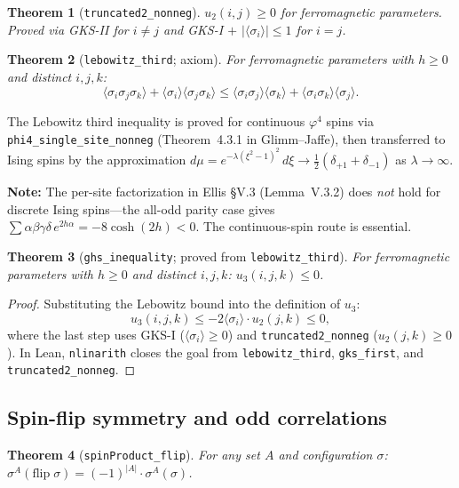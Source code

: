 \documentclass[a4paper,11pt]{article}
\newtheorem{theorem}{Theorem}
\begin{document}
\begin{theorem}[\texttt{truncated2\_nonneg}]
$u_2(i,j) \ge 0$ for ferromagnetic parameters. Proved via GKS-II
for $i \ne j$ and GKS-I $+$ $|\langle\sigma_i\rangle| \le 1$ for $i = j$.
\end{theorem}

\begin{theorem}[\texttt{lebowitz\_third}; axiom]
For ferromagnetic parameters with $h \ge 0$ and distinct $i, j, k$:
\[
  \langle\sigma_i\sigma_j\sigma_k\rangle + \langle\sigma_i\rangle\langle\sigma_j\sigma_k\rangle
  \le \langle\sigma_i\sigma_j\rangle\langle\sigma_k\rangle + \langle\sigma_i\sigma_k\rangle\langle\sigma_j\rangle.
\]
\end{theorem}

The Lebowitz third inequality is proved for continuous $\varphi^4$ spins
via \texttt{phi4\_single\_site\_nonneg} (Theorem~4.3.1 in Glimm--Jaffe),
then transferred to Ising spins by the approximation
$d\mu = e^{-\lambda(\xi^2-1)^2}\,d\xi \to \frac{1}{2}(\delta_{+1}+\delta_{-1})$
as $\lambda \to \infty$.

\textbf{Note:} The per-site factorization in Ellis \S V.3 (Lemma~V.3.2)
does \emph{not} hold for discrete Ising spins---the all-odd parity case
gives $\sum \alpha\beta\gamma\delta\, e^{2h\alpha} = -8\cosh(2h) < 0$.
The continuous-spin route is essential.

\begin{theorem}[\texttt{ghs\_inequality}; proved from \texttt{lebowitz\_third}]
For ferromagnetic parameters with $h \ge 0$ and distinct $i, j, k$:
$u_3(i,j,k) \le 0$.
\end{theorem}

\begin{proof}
Substituting the Lebowitz bound into the definition of $u_3$:
\[
  u_3(i,j,k) \le -2\langle\sigma_i\rangle \cdot u_2(j,k) \le 0,
\]
where the last step uses GKS-I ($\langle\sigma_i\rangle \ge 0$) and
\texttt{truncated2\_nonneg} ($u_2(j,k) \ge 0$).
In Lean, \texttt{nlinarith} closes the goal from
\texttt{lebowitz\_third}, \texttt{gks\_first}, and
\texttt{truncated2\_nonneg}.
\end{proof}

\subsection{Spin-flip symmetry and odd correlations}

\begin{theorem}[\texttt{spinProduct\_flip}]
For any set $A$ and configuration $\sigma$:
$\sigma^A(\mathrm{flip}\;\sigma) = (-1)^{|A|} \cdot \sigma^A(\sigma)$.
\end{theorem}
\end{document}
